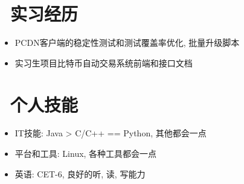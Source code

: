 \documentclass{resume}
\begin{document}
\section{\faUsers\ 实习经历}
\begin{itemize}
  \item PCDN客户端的稳定性测试和测试覆盖率优化, 批量升级脚本
  \item 实习生项目比特币自动交易系统前端和接口文档
\end{itemize}

\section{\faCogs\ 个人技能}
\begin{itemize}[parsep=0.5ex]
  \item IT技能: Java > C/C++ == Python, 其他都会一点
  \item 平台和工具: Linux, 各种工具都会一点
  \item 英语: CET-6, 良好的听, 读, 写能力
\end{itemize}

% 


\end{document}
